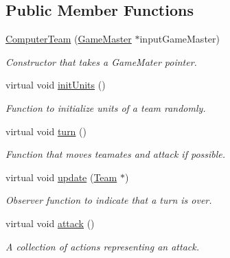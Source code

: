 \subsection*{Public Member Functions}
\begin{DoxyCompactItemize}
\item 
\hypertarget{class_computer_team_a51fe84b449942ad27c3430baf739c88f}{}\hyperlink{class_computer_team_a51fe84b449942ad27c3430baf739c88f}{Computer\+Team} (\hyperlink{class_game_master}{Game\+Master} $\ast$input\+Game\+Master)\label{class_computer_team_a51fe84b449942ad27c3430baf739c88f}

\begin{DoxyCompactList}\small\item\em Constructor that takes a Game\+Mater pointer. \end{DoxyCompactList}\item 
\hypertarget{class_computer_team_acc4d7314cca36526d7b2d4315374ec66}{}virtual void \hyperlink{class_computer_team_acc4d7314cca36526d7b2d4315374ec66}{init\+Units} ()\label{class_computer_team_acc4d7314cca36526d7b2d4315374ec66}

\begin{DoxyCompactList}\small\item\em Function to initialize units of a team randomly. \end{DoxyCompactList}\item 
\hypertarget{class_computer_team_aefc2941cfd59f175dd200daf2b025d21}{}virtual void \hyperlink{class_computer_team_aefc2941cfd59f175dd200daf2b025d21}{turn} ()\label{class_computer_team_aefc2941cfd59f175dd200daf2b025d21}

\begin{DoxyCompactList}\small\item\em Function that moves teamates and attack if possible. \end{DoxyCompactList}\item 
\hypertarget{class_computer_team_a7adf17f4d2d110f215bc004f048528a3}{}virtual void \hyperlink{class_computer_team_a7adf17f4d2d110f215bc004f048528a3}{update} (\hyperlink{class_team}{Team} $\ast$)\label{class_computer_team_a7adf17f4d2d110f215bc004f048528a3}

\begin{DoxyCompactList}\small\item\em Observer function to indicate that a turn is over. \end{DoxyCompactList}\item 
\hypertarget{class_computer_team_a1cbb3fa4465694daa0d9b85cc1976c0b}{}virtual void \hyperlink{class_computer_team_a1cbb3fa4465694daa0d9b85cc1976c0b}{attack} ()\label{class_computer_team_a1cbb3fa4465694daa0d9b85cc1976c0b}

\begin{DoxyCompactList}\small\item\em A collection of actions representing an attack. \end{DoxyCompactList}\end{DoxyCompactItemize}

